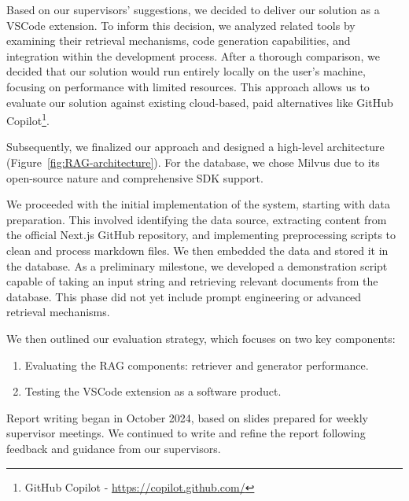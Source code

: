 Based on our supervisors' suggestions, we decided to deliver our solution as a VSCode extension. To inform this decision, we analyzed related tools by examining their retrieval mechanisms, code generation capabilities, and integration within the development process. After a thorough comparison, we decided that our solution would run entirely locally on the user’s machine, focusing on performance with limited resources. This approach allows us to evaluate our solution against existing cloud-based, paid alternatives like GitHub Copilot\footnote{GitHub Copilot - \url{https://copilot.github.com/}}.

Subsequently, we finalized our approach and designed a high-level architecture (Figure~\ref{fig:RAG-architecture}). For the database, we chose Milvus \cite{wang2021milvus} due to its open-source nature and comprehensive SDK support.

We proceeded with the initial implementation of the system, starting with data preparation. This involved identifying the data source, extracting content from the official Next.js GitHub repository, and implementing preprocessing scripts to clean and process markdown files. We then embedded the data and stored it in the database. As a preliminary milestone, we developed a demonstration script capable of taking an input string and retrieving relevant documents from the database. This phase did not yet include prompt engineering or advanced retrieval mechanisms.

We then outlined our evaluation strategy, which focuses on two key components:
\begin{enumerate}
	\item Evaluating the RAG components: retriever and generator performance.
	\item Testing the VSCode extension as a software product.
\end{enumerate}

Report writing began in October 2024, based on slides prepared for weekly supervisor meetings. We continued to write and refine the report following feedback and guidance from our supervisors.



    
